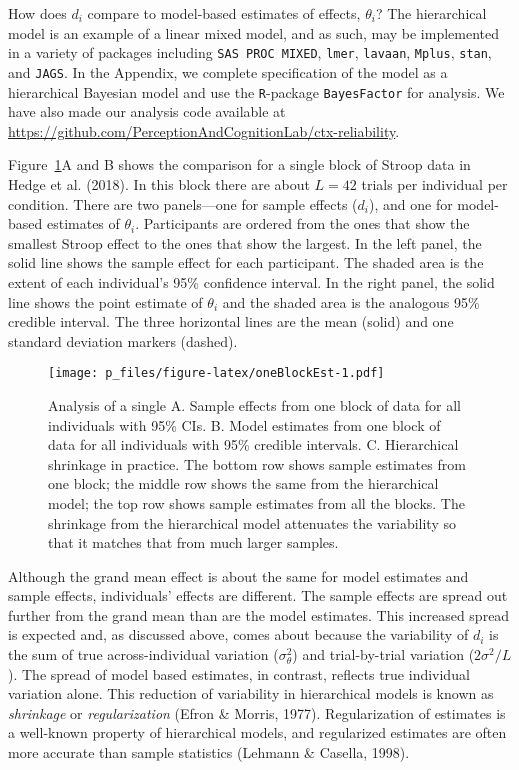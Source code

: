 \documentclass[english,man]{apa6}
\theoremstyle{definition}
\theoremstyle{definition}
\theoremstyle{definition}
\theoremstyle{remark}
\begin{document}
How does \(d_i\) compare to model-based estimates of effects,
\(\theta_i\)? The hierarchical model is an example of a linear mixed
model, and as such, may be implemented in a variety of packages
including \texttt{SAS\ PROC\ MIXED}, \texttt{lmer}, \texttt{lavaan},
\texttt{Mplus}, \texttt{stan}, and \texttt{JAGS}. In the Appendix, we
complete specification of the model as a hierarchical Bayesian model and
use the \texttt{R}-package \texttt{BayesFactor} for analysis. We have
also made our analysis code available at
\url{https://github.com/PerceptionAndCognitionLab/ctx-reliability}.

Figure~\ref{fig:oneBlockEst}A and B shows the comparison for a single
block of Stroop data in Hedge et al. (2018). In this block there are
about \(L=42\) trials per individual per condition. There are two
panels---one for sample effects (\(d_i\)), and one for model-based
estimates of \(\theta_i\). Participants are ordered from the ones that
show the smallest Stroop effect to the ones that show the largest. In
the left panel, the solid line shows the sample effect for each
participant. The shaded area is the extent of each individual's 95\%
confidence interval. In the right panel, the solid line shows the point
estimate of \(\theta_i\) and the shaded area is the analogous 95\%
credible interval. The three horizontal lines are the mean (solid) and
one standard deviation markers (dashed).

\begin{figure}[htbp]
\centering
\texttt{[image: p\_files/figure-latex/oneBlockEst-1.pdf]}
\caption{\label{fig:oneBlockEst}Analysis of a single A. Sample effects from
one block of data for all individuals with 95\% CIs. B. Model estimates
from one block of data for all individuals with 95\% credible intervals.
C. Hierarchical shrinkage in practice. The bottom row shows sample
estimates from one block; the middle row shows the same from the
hierarchical model; the top row shows sample estimates from all the
blocks. The shrinkage from the hierarchical model attenuates the
variability so that it matches that from much larger samples.}
\end{figure}

Although the grand mean effect is about the same for model estimates and
sample effects, individuals' effects are different. The sample effects
are spread out further from the grand mean than are the model estimates.
This increased spread is expected and, as discussed above, comes about
because the variability of \(d_i\) is the sum of true across-individual
variation (\(\sigma^2_\theta\)) and trial-by-trial variation
(\(2\sigma^2/L\)). The spread of model based estimates, in contrast,
reflects true individual variation alone. This reduction of variability
in hierarchical models is known as \emph{shrinkage} or
\emph{regularization} (Efron \& Morris, 1977). Regularization of
estimates is a well-known property of hierarchical models, and
regularized estimates are often more accurate than sample statistics
(Lehmann \& Casella, 1998).
\end{document}
